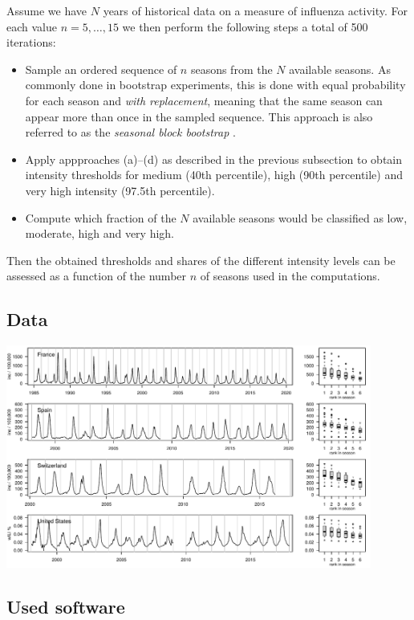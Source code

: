 \documentclass{article}
\begin{document}
Assume we have $N$ years of historical data on a measure of influenza activity. For each value $n = 5, \dots, 15$ we then perform the following steps a total of 500 iterations:

\begin{itemize}
\item Sample an ordered sequence of $n$ seasons from the $N$ available seasons. As commonly done in bootstrap experiments, this is done with equal probability for each season and \textit{with replacement}, meaning that the same season can appear more than once in the sampled sequence. This approach is also referred to as the \textit{seasonal block bootstrap} \citep{Politis2001}.
\item Apply appproaches (a)--(d) as described in the previous subsection to obtain intensity thresholds for medium (40th percentile), high (90th percentile) and very high intensity (97.5th percentile).
\item Compute which fraction of the $N$ available seasons would be classified as low, moderate, high and very high.
\end{itemize}

Then the obtained thresholds and shares of the different intensity levels can be assessed as a function of the number $n$ of seasons used in the computations.

\subsection{Data}

\includegraphics[width=0.9\textwidth]{figure/plot_data.pdf}

\subsection{Used software}
\end{document}
